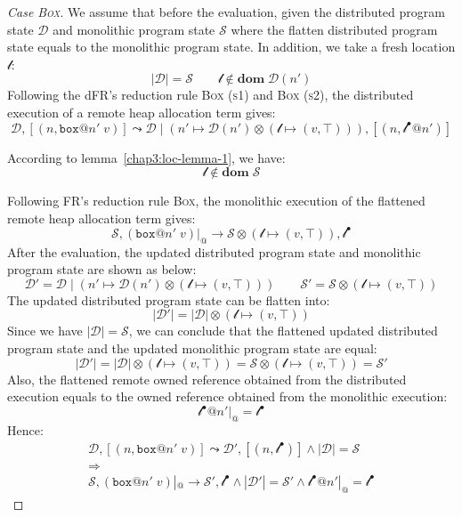 \begin{proof}[Case \textsc{\emph{Box}}]
We assume that before the evaluation, given the distributed program state $\mathcal{D}$ and monolithic program state $\mathcal{S}$ where the flatten distributed program state equals to the monolithic program state. In addition, we take a fresh location $\mathscr{l}$:
\[
|\mathcal{D}| = \mathcal{S} \quad\quad \mathscr{l} \notin \textbf{dom}\; \mathcal{D}(n')
\]
Following the dFR's reduction rule \textsc{Box (s1)} and \textsc{Box (s2)}, the distributed execution of a remote heap allocation term gives:
\[
\mathcal{D}, [(n, \texttt{box}@n'\;v)] \leadsto \mathcal{D} \mid (n' \mapsto \mathcal{D}(n')\otimes(\mathscr{l} \mapsto (v, \top))), [(n, \mathscr{l}^\bullet@n')]
\]
\begin{highlightnew}
According to lemma~\ref{chap3:loc-lemma-1}, we have:
\[\mathscr{l} \notin \textbf{dom}\; \mathcal{S}\] 
\end{highlightnew}
Following FR's reduction rule \textsc{Box}, the monolithic execution of the flattened remote heap allocation term gives:
\[
\mathcal{S}, (\texttt{box}@n'\;v)|_@ \longrightarrow \mathcal{S} \otimes (\mathscr{l} \mapsto (v, \top)), \mathscr{l}^\bullet
\]
After the evaluation, the updated distributed program state and monolithic program state are shown as below:
\[
\mathcal{D}' = \mathcal{D} \mid (n' \mapsto \mathcal{D}(n')\otimes(\mathscr{l} \mapsto (v, \top))) \quad\quad 
\mathcal{S}' = \mathcal{S} \otimes (\mathscr{l} \mapsto (v, \top))
\]
The updated distributed program state can be flatten into:
\[|\mathcal{D}'| = |\mathcal{D}| \otimes (\mathscr{l} \mapsto (v, \top))\]
Since we have $|\mathcal{D}| = \mathcal{S}$, we can conclude that the flattened updated distributed program state and the updated monolithic program state are equal:
\[|\mathcal{D}'| = |\mathcal{D}| \otimes (\mathscr{l} \mapsto (v, \top)) = \mathcal{S} \otimes (\mathscr{l} \mapsto (v, \top))= \mathcal{S}'\]
Also, the flattened remote owned reference obtained from the distributed execution equals to the owned reference obtained from the monolithic execution:
\[\mathscr{l}^\bullet@n'|_@ = \mathscr{l}^\bullet\]
Hence:
\begin{gather*}
\mathcal{D}, [(n, \texttt{box}@n'\;v)] \leadsto \mathcal{D'}, [(n, \mathscr{l}^\bullet)] \land |\mathcal{D}| = \mathcal{S} \\\Rightarrow\\ \mathcal{S},  (\texttt{box}@n'\;v)|_@ \longrightarrow \mathcal{S'}, \mathscr{l}^\bullet \land |\mathcal{D}'| = \mathcal{S}' \land \mathscr{l}^\bullet@n'|_@ = \mathscr{l}^\bullet

\end{gather*}
\end{proof}

